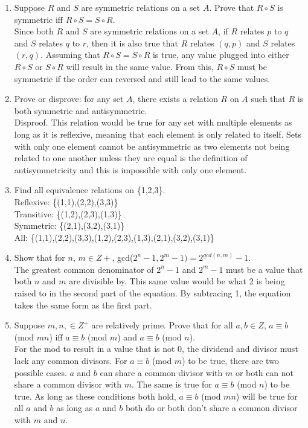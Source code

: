 \documentclass{article}
\begin{document}
\begin{enumerate}
\item Suppose $R$ and $S$ are symmetric relations on a set $A$. Prove that $R \circ S $ is symmetric iff $R \circ S = S \circ R$. \\
Since both $R$ and $S$ are symmetric relations on a set $A$, if $R$ relates $p$ to $q$ and $S$ relates $q$ to $r$, then it is also true that $R$ relates $(q, p)$ and $S$ relates $(r,q)$. Assuming that $R \circ S = S \circ R$ is true, any value plugged into either $R \circ S$ or $S \circ R$ will result in the same value. From this, $R \circ S$ must be symmetric if the order can reversed and still lead to the same values. 

\item Prove or disprove: for any set $A$, there exists a relation $R$ on $A$ such that $R$ is both symmetric and antisymmetric. \\
Disproof. This relation would be true for any set with multiple elements as long as it is reflexive, meaning that each element is only related to itself. Sets with only one element cannot be antisymmetric as two elements not being related to one another unless they are equal is the definition of antisymmetricity and this is impossible with only one element.

\item Find all equivalence relations on \{1,2,3\}. \\
Reflexive: \{(1,1),(2,2),(3,3)\} \\
Transitive: \{(1,2),(2,3),(1,3)\} \\
Symmetric: \{(2,1),(3,2),(3,1)\} \\
All: \{(1,1),(2,2),(3,3),(1,2),(2,3),(1,3),(2,1),(3,2),(3,1)\}

\item Show that for $n$, $m \in Z+$, gcd($2^n -1, 2^m -1)= 2^{gcd(n,m)} - 1$. \\
The greatest common denominator of $2^n -1$  and $2^m -1$ must be a value that both $n$ and $m$ are divisible by. This same value would be what 2 is being raised to in the second part of the equation. By subtracing 1, the equation takes the same form as the first part.

\item Suppose $m,n, \in Z^+$ are relatively prime. Prove that for all $a,b \in Z$, $a \equiv b$ (mod $mn$) iff $a \equiv b$ (mod $m$) and $a \equiv b$ (mod $n$). \\
For the mod to result in a value that is not 0, the dividend and divisor must lack any common divisors. For $a \equiv b$ (mod $m$) to be true, there are two possible cases. $a$ and $b$ can share a common divisor with $m$ or both can not share a common divisor with $m$. The same is true for $a \equiv b$ (mod $n$) to be true. As long as these conditions both hold, $a \equiv b$ (mod $mn$) will be true for all $a$ and $b$ as long as $a$ and $b$ both do or both don't share a common divisor with $m$ and $n$.



\end{enumerate}
\end{document}
